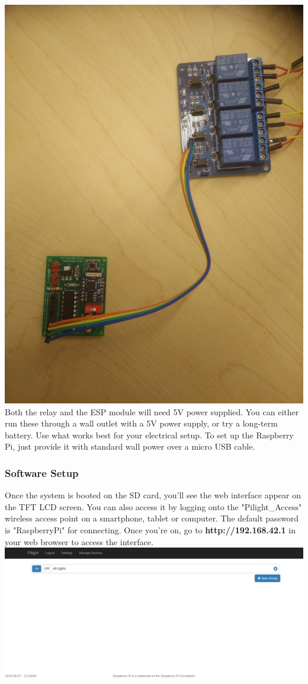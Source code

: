 \includegraphics[scale=0.05]{connection}\\
Both the relay and the ESP module will need 5V power supplied. You can either run these through a wall outlet with a 5V power supply, or try a long-term battery. Use what works best for your electrical setup. To set up the Raspberry Pi, just provide it with standard wall power over a micro USB cable.
\subsubsection{Software Setup}
Once the system is booted on the SD card, you'll see the web interface appear on the TFT LCD screen. You can also access it by logging onto the "Pilight\_Access" wireless access point on a smartphone, tablet or computer. The default password is "RaspberryPi" for connecting. Once you're on, go to \textbf{http://192.168.42.1} in your web browser to access the interface.\\
\includegraphics[width=1.0\textwidth]{basepage.png}\\
